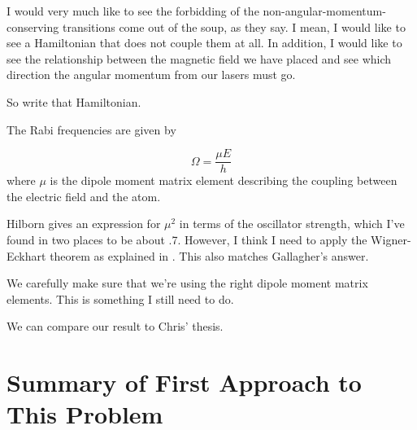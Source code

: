 

 I would very much like to see the forbidding of the non-angular-momentum-conserving transitions come out of the soup, as they say. I mean, I would like to see a Hamiltonian that does not couple them at all. In addition, I would like to see the relationship between the magnetic field we have placed and see which direction the angular momentum from our lasers must go. 


So write that Hamiltonian.  


The Rabi frequencies are given by 

\begin{equation}
\Omega=\frac{\mu E}{h}
\end{equation} \cite{hilbornNoGetConfused}
where $\mu$ is the dipole moment matrix element describing the coupling between the electric field and the atom. 

Hilborn gives an expression for $\mu^2$ in terms of the oscillator strength, which I've found in two places \cite{safronovaTheory} \cite{NISTasd} to be about .7. However, I think I need to apply the Wigner-Eckhart theorem as explained in \cite{demilleBudkerKimball}. This also matches Gallagher's answer. 

We carefully make sure that we're using the right dipole moment matrix elements. This is something I still need to do. 

We can compare our result to Chris' thesis. 

\section{Summary of First Approach to This Problem}

